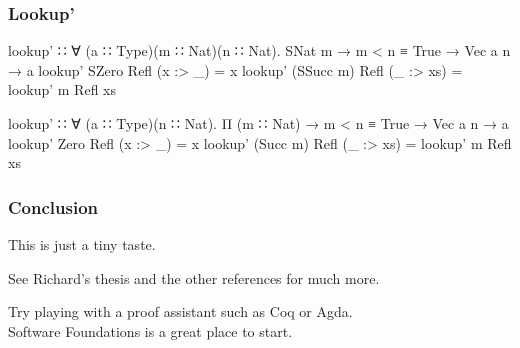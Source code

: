 \documentclass{beamer}
\begin{document}
\begin{frame}[fragile]\frametitle{Lookup'}
\begin{semiverbatim}
lookup' ∷ ∀ (a ∷ Type)(m ∷ Nat)(n ∷ Nat).
          SNat m → m < n ≡ True → Vec a n → a
lookup' SZero     Refl (x :> _)  = x
lookup' (SSucc m) Refl (_ :> xs) = lookup' m Refl xs

lookup' ∷ ∀ (a ∷ Type)(n ∷ Nat). Π (m ∷ Nat) →
          m < n ≡ True → Vec a n → a
lookup' Zero     Refl (x :> _)  = x
lookup' (Succ m) Refl (_ :> xs) = lookup' m Refl xs
\end{semiverbatim}
\end{frame}

\begin{frame}\frametitle{Conclusion}
This is just a tiny taste.
\bigskip  

See Richard's thesis and the other references for much more.  
\bigskip  

Try playing with a proof assistant such as Coq or Agda.\\
Software Foundations is a great place to start.
\end{frame}
\end{document}
